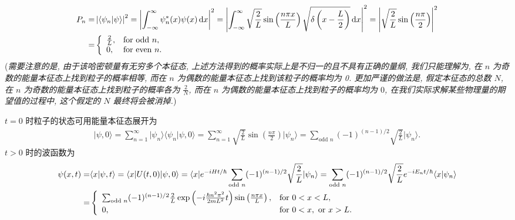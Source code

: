 \documentclass{assignment}
\begin{document}
\begin{sol}
\begin{align}
        \notag P_n=&\left\lvert\langle\psi_n\vert\psi\rangle\right\rvert^2=\left\lvert\int_{-\infty}^{\infty}\psi_n^*(x)\psi(x)\,\mathrm{d}x\right\rvert^2=\left\lvert\int_{-\infty}^{\infty}\sqrt{\frac{2}{L}}\sin\left(\frac{n\pi x}{L}\right)\sqrt{\delta\left(x-\frac{L}{2}\right)}\,\mathrm{d}x\right\rvert^2=\left\lvert\sqrt{\frac{2}{L}}\sin\left(\frac{n\pi}{2}\right)\right\rvert^2\\
        =&\left\{\begin{array}{ll}
            \frac{2}{L},&\text{for odd }n,\\
            0,&\text{for even }n.
        \end{array}\right.
    \end{align}
    (\textit{需要注意的是, 由于该哈密顿量有无穷多个本征态, 上述方法得到的概率实际上是不归一的且不具有正确的量纲, 我们只能理解为, 在 $n$ 为奇数的能量本征态上找到粒子的概率相等, 而在 $n$ 为偶数的能量本征态上找到该粒子的概率均为 0. 更加严谨的做法是, 假定本征态的总数 $N$, 在 $n$ 为奇数的能量本征态上找到粒子的概率各为 $\frac{2}{N}$, 而在 $n$ 为偶数的能量本征态上找到粒子的概率均为 $0$, 在我们实际求解某些物理量的期望值的过程中, 这个假定的 $N$ 最终将会被消掉.})

    $t=0$ 时粒子的状态可用能量本征态展开为
    \begin{align}
        \lvert\psi,0\rangle=\sum_{n=1}^{\infty}\lvert\psi_n\rangle\langle\psi_n\vert\psi,0\rangle=\sum_{n=1}^{\infty}\sqrt{\frac{2}{L}}\sin\left(\frac{n\pi}{2}\right)\lvert\psi_n\rangle=\sum_{\text{odd }n}(-1)^{(n-1)/2}\sqrt{\frac{2}{L}}\lvert\psi_n\rangle.
    \end{align}
    $t>0$ 时的波函数为
    \begin{align}
        \notag\psi(x,t)=&\langle x\vert\psi,t\rangle=\langle x\rvert U(t,0)\lvert\psi,0\rangle=\langle x\rvert e^{-iHt/\hbar}\sum_{\text{odd }n}(-1)^{(n-1)/2}\sqrt{\frac{2}{L}}\lvert\psi_n\rangle=\sum_{\text{odd }n}(-1)^{(n-1)/2}\sqrt{\frac{2}{L}}e^{-iE_nt/\hbar}\langle x\vert\psi_n\rangle\\
        =&\left\{\begin{array}{ll}
            \sum_{\text{odd }n}(-1)^{(n-1)/2}\frac{2}{L}\exp\left(-i\frac{\hbar n^2\pi^2}{2mL^2}t\right)\sin\left(\frac{n\pi x}{L}\right),&\text{for }0<x<L,\\
            0,&\text{for }0<x,\text{ or }x>L.
        \end{array}\right.
    \end{align}
\end{sol}
\end{document}

